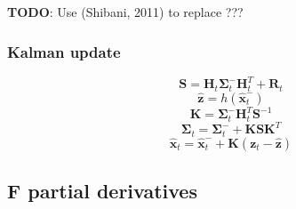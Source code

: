 \documentclass[]{article}
\begin{document}
\textbf{TODO}: Use (Shibani, 2011) to replace ???

\subsubsection{Kalman update}\label{kalman-update-1}

\[\mathbf{S} = \mathbf{H}_t \mathbf{\Sigma}^{-}_t \mathbf{H}_t^T + \mathbf{R}_t\]
\[\hat{\mathbf{z}} = h(\hat{\mathbf{x}}^{-}_t)\]
\[\mathbf{K} = \mathbf{\Sigma}^{-}_t \mathbf{H}_t^T \mathbf{S}^{-1}\]
\[\mathbf{\Sigma}_t = \mathbf{\Sigma}^-_t + \mathbf{K} \mathbf{S} \mathbf{K}^T\]
\[\hat{\mathbf{x}}_t = \hat{\mathbf{x}}^{-}_t + \mathbf{K}(\mathbf{z}_t - \hat{\mathbf{z}})\]

\subsection{F partial derivatives}\label{f-partial-derivatives}
\end{document}
